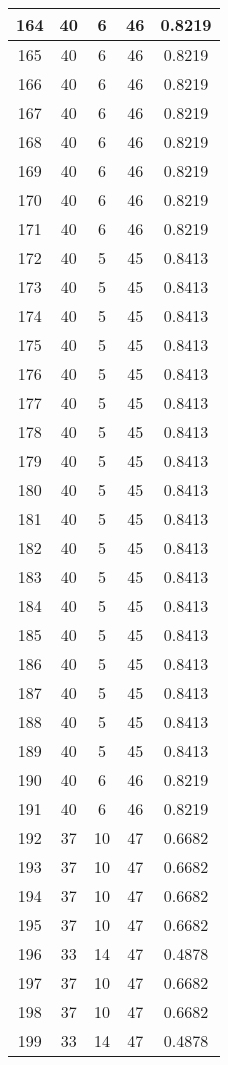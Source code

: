 \documentclass[letterpaper, 12pt]{article}
\begin{document}
\begin{longtable}{|c|c|c|c|c|}
\hline
164 & 40 & 6 & 46 & 0.8219 \\
\hline
165 & 40 & 6 & 46 & 0.8219 \\
\hline
166 & 40 & 6 & 46 & 0.8219 \\
\hline
167 & 40 & 6 & 46 & 0.8219 \\
\hline
168 & 40 & 6 & 46 & 0.8219 \\
\hline
169 & 40 & 6 & 46 & 0.8219 \\
\hline
170 & 40 & 6 & 46 & 0.8219 \\
\hline
171 & 40 & 6 & 46 & 0.8219 \\
\hline
172 & 40 & 5 & 45 & 0.8413 \\
\hline
173 & 40 & 5 & 45 & 0.8413 \\
\hline
174 & 40 & 5 & 45 & 0.8413 \\
\hline
175 & 40 & 5 & 45 & 0.8413 \\
\hline
176 & 40 & 5 & 45 & 0.8413 \\
\hline
177 & 40 & 5 & 45 & 0.8413 \\
\hline
178 & 40 & 5 & 45 & 0.8413 \\
\hline
179 & 40 & 5 & 45 & 0.8413 \\
\hline
180 & 40 & 5 & 45 & 0.8413 \\
\hline
181 & 40 & 5 & 45 & 0.8413 \\
\hline
182 & 40 & 5 & 45 & 0.8413 \\
\hline
183 & 40 & 5 & 45 & 0.8413 \\
\hline
184 & 40 & 5 & 45 & 0.8413 \\
\hline
185 & 40 & 5 & 45 & 0.8413 \\
\hline
186 & 40 & 5 & 45 & 0.8413 \\
\hline
187 & 40 & 5 & 45 & 0.8413 \\
\hline
188 & 40 & 5 & 45 & 0.8413 \\
\hline
189 & 40 & 5 & 45 & 0.8413 \\
\hline
190 & 40 & 6 & 46 & 0.8219 \\
\hline
191 & 40 & 6 & 46 & 0.8219 \\
\hline
192 & 37 & 10 & 47 & 0.6682 \\
\hline
193 & 37 & 10 & 47 & 0.6682 \\
\hline
194 & 37 & 10 & 47 & 0.6682 \\
\hline
195 & 37 & 10 & 47 & 0.6682 \\
\hline
196 & 33 & 14 & 47 & 0.4878 \\
\hline
197 & 37 & 10 & 47 & 0.6682 \\
\hline
198 & 37 & 10 & 47 & 0.6682 \\
\hline
199 & 33 & 14 & 47 & 0.4878 \\
\hline
\end{longtable}
\end{document}
